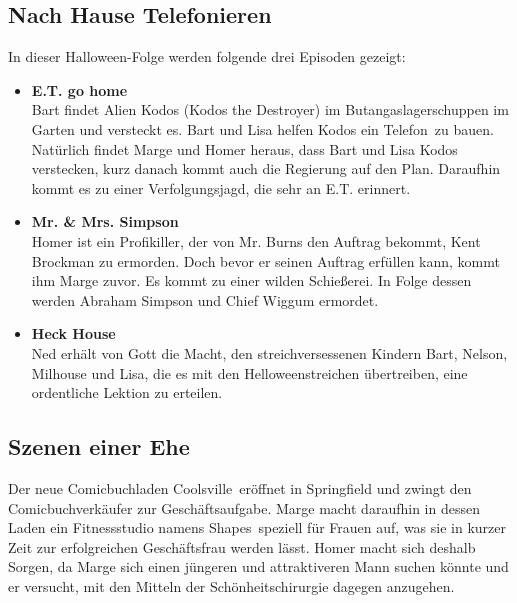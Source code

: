 \subsection{Nach Hause Telefonieren}
In dieser Halloween-Folge werden folgende drei Episoden gezeigt:
\begin{itemize}
	\item \textbf{E.T. go home}\\ Bart findet Alien Kodos (\glqq Kodos the Destroyer\grqq ) im Butangaslagerschuppen im Garten und versteckt es. Bart und Lisa helfen Kodos ein \glqq Telefon\grqq\ zu bauen. Natürlich findet Marge und Homer heraus, dass Bart und Lisa Kodos verstecken, kurz danach kommt auch die Regierung auf den Plan. Daraufhin kommt es zu einer Verfolgungsjagd, die sehr an E.T. erinnert.
	\item \textbf{Mr. \& Mrs. Simpson}\\ Homer ist ein Profikiller, der von Mr. Burns den Auftrag bekommt, Kent Brockman zu ermorden. Doch bevor er seinen Auftrag erfüllen kann, kommt ihm Marge zuvor. Es kommt zu einer wilden Schießerei. In Folge dessen werden Abraham Simpson und Chief Wiggum ermordet.
	\item \textbf{Heck House}\\ Ned erhält von Gott die Macht, den streichversessenen Kindern Bart, Nelson, Milhouse und Lisa, die es mit den Helloweenstreichen übertreiben, eine ordentliche Lektion zu erteilen. 
\end{itemize}


\subsection{Szenen einer Ehe}
Der neue Comicbuchladen \glqq Coolsville\grqq\ eröffnet in Springfield und zwingt den Comic\-buch\-ver\-käu\-fer zur Geschäftsaufgabe. Marge macht daraufhin in dessen Laden ein Fitnessstudio namens \glqq Shapes\grqq\ speziell für Frauen auf, was sie in kurzer Zeit zur erfolgreichen Geschäftsfrau werden lässt. Homer macht sich deshalb Sorgen, da Marge sich einen jüngeren und attraktiveren Mann suchen könnte und er versucht, mit den Mitteln der Schönheits\-chirurgie dagegen anzugehen. 

